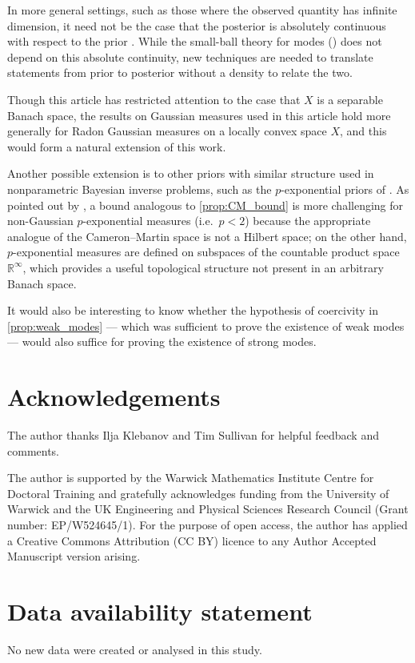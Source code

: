 \documentclass[11pt]{article}
\newcommand*{\Reals}{\mathbb{R}}
\theoremstyle{plain}
\theoremstyle{definition}
\numberwithin{equation}{section}
\numberwithin{figure}{section}
\numberwithin{table}{section}
\begin{document}
In more general settings, such as those where the observed quantity has infinite dimension, it need not be the case that the posterior is absolutely continuous with respect to the prior \citep[Remark~3.8]{Stuart2010}.
While the small-ball theory for modes () does not depend on this absolute continuity, new techniques are needed to translate statements from prior to posterior without a density to relate the two.

Though this article has restricted attention to the case that $X$ is a separable Banach space, the results on Gaussian measures used in this article hold more generally for Radon Gaussian measures on a locally convex space $X$, and this would form a natural extension of this work.

Another possible extension is to other priors with similar structure used in nonparametric Bayesian inverse problems, such as the $p$-exponential priors of \citet{AgapiouDashtiHelin2021}.
As pointed out by \citet[Remark~2.14]{AgapiouDashtiHelin2021}, a bound analogous to \cref{prop:CM_bound} is more challenging for non-Gaussian $p$-exponential measures (i.e.\ $p < 2$) because the appropriate analogue of the Cameron--Martin space is not a Hilbert space;
on the other hand, $p$-exponential measures are defined on subspaces of the countable product space $\Reals^{\infty}$, which provides a useful topological structure not present in an arbitrary Banach space.

It would also be interesting to know whether the hypothesis of coercivity in \cref{prop:weak_modes} --- which was sufficient to prove the existence of weak modes --- would also suffice for proving the existence of strong modes.


\section*{Acknowledgements}

The author thanks Ilja Klebanov and Tim Sullivan for helpful feedback and comments.%


The author is supported by the Warwick Mathematics Institute Centre for Doctoral Training and gratefully acknowledges funding from the University of Warwick and the UK Engineering and Physical Sciences Research Council (Grant number: EP/W524645/1).
For the purpose of open access, the author has applied a Creative Commons Attribution (CC BY) licence to any Author Accepted Manuscript version arising.



\section*{Data availability statement}
 No new data were created or analysed in this study.



\end{document}
